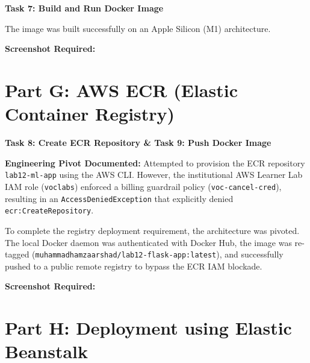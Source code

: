 \documentclass[12pt,a4paper]{article}
\begin{document}
\begin{tcolorbox}
\textbf{Task 7: Build and Run Docker Image}

The image was built successfully on an Apple Silicon (M1) architecture.

\textbf{Screenshot Required:}
\begin{center}


\vspace{1cm}

\end{center}

\end{tcolorbox}


\section*{Part G: AWS ECR (Elastic Container Registry)}

\begin{tcolorbox}
\textbf{Task 8: Create ECR Repository \& Task 9: Push Docker Image}

\textbf{Engineering Pivot Documented:} 
Attempted to provision the ECR repository \texttt{lab12-ml-app} using the AWS CLI. However, the institutional AWS Learner Lab IAM role (\texttt{voclabs}) enforced a billing guardrail policy (\texttt{voc-cancel-cred}), resulting in an \texttt{AccessDeniedException} that explicitly denied \texttt{ecr:CreateRepository}. 

To complete the registry deployment requirement, the architecture was pivoted. The local Docker daemon was authenticated with Docker Hub, the image was re-tagged (\texttt{muhammadhamzaarshad/lab12-flask-app:latest}), and successfully pushed to a public remote registry to bypass the ECR IAM blockade.

\textbf{Screenshot Required:}
\begin{center}

\end{center}

\end{tcolorbox}


\section*{Part H: Deployment using Elastic Beanstalk}
\end{document}
